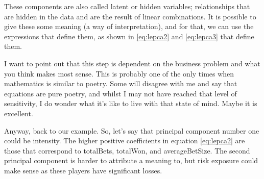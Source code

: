 \documentclass[a4,12pt,twosided,openany]{memoir}
\begin{document}
\par 
\indent
These components are also called latent or hidden variables; relationships that are hidden in the data and are the result of linear combinations. It is possible to give these some meaning (a way of interpretation), and for that, we can use the expressions that define them, as shown in \ref{eq:lepca2} and \ref{eq:lepca3} that define them. 
\par 
\indent
I want to point out that this step is dependent on the business problem and what you think makes most sense. This is probably one of the only times when mathematics is similar to poetry. Some will disagree with me and say that equations are pure poetry, and whilst I may not have reached that level of sensitivity, I do wonder what it’s like to live with that state of mind. Maybe it is excellent. 
\par 
\indent
Anyway, back to our example. So, let’s say that principal component number one could be intensity. The higher positive coefficients in equation \ref{eq:lepca2} are those that correspond to totalBets, totalWon, and averageBetSize. The second principal component is harder to attribute a meaning to, but risk exposure could make sense as these players have significant losses.
\end{document}
